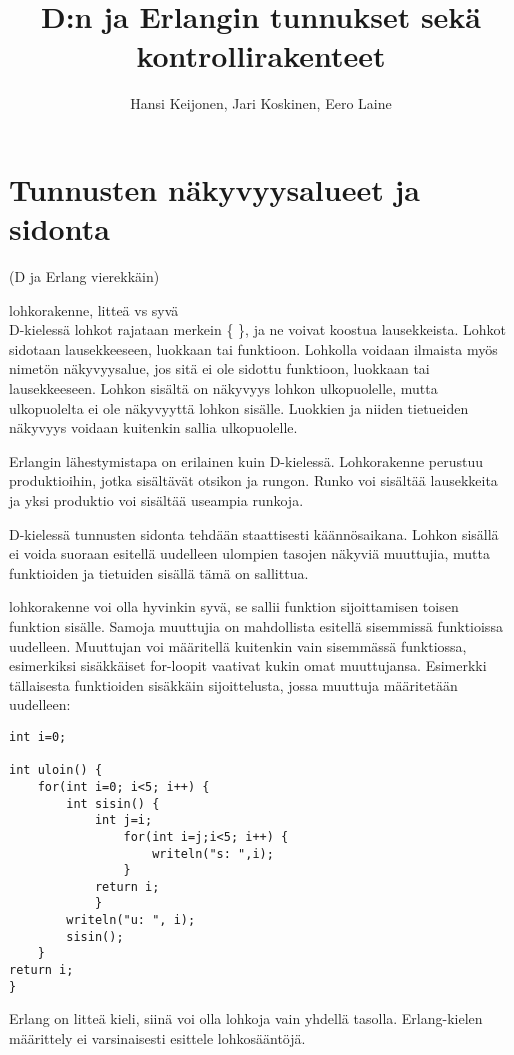 \documentclass[11pt,oneside,a4paper]{article}
\title{D:n ja Erlangin tunnukset sekä kontrollirakenteet}
\author{Hansi Keijonen, Jari Koskinen, Eero Laine}
\begin{document}
\maketitle



\section{Tunnusten näkyvyysalueet ja sidonta}
(D ja Erlang vierekkäin)

lohkorakenne, litteä vs syvä \\
D-kielessä lohkot rajataan merkein \{ \}, ja ne voivat koostua lausekkeista. Lohkot sidotaan lausekkeeseen, luokkaan tai funktioon. Lohkolla voidaan ilmaista myös nimetön näkyvyysalue, jos sitä ei ole sidottu funktioon, luokkaan tai lausekkeeseen. Lohkon sisältä on näkyvyys lohkon ulkopuolelle, mutta ulkopuolelta ei ole näkyvyyttä lohkon sisälle. Luokkien ja niiden tietueiden näkyvyys voidaan kuitenkin sallia ulkopuolelle.

Erlangin lähestymistapa on erilainen kuin D-kielessä. Lohkorakenne perustuu produktioihin, jotka sisältävät otsikon ja rungon. Runko voi sisältää lausekkeita ja yksi produktio voi sisältää useampia runkoja.

D-kielessä tunnusten sidonta tehdään staattisesti käännösaikana. Lohkon sisällä ei voida suoraan esitellä uudelleen ulompien tasojen näkyviä muuttujia, mutta funktioiden ja tietuiden sisällä tämä on sallittua.

 lohkorakenne voi olla hyvinkin syvä, se sallii funktion sijoittamisen toisen funktion sisälle. Samoja muuttujia on mahdollista esitellä sisemmissä funktioissa uudelleen. Muuttujan voi määritellä kuitenkin vain sisemmässä funktiossa, esimerkiksi sisäkkäiset for-loopit vaativat kukin omat muuttujansa. Esimerkki tällaisesta funktioiden sisäkkäin sijoittelusta, jossa muuttuja määritetään uudelleen:

\begin{verbatim}
int i=0;

int uloin() {
    for(int i=0; i<5; i++) {
        int sisin() {
            int j=i;
                for(int i=j;i<5; i++) {
                    writeln("s: ",i);
                }
            return i;
            }
        writeln("u: ", i);
        sisin();
    }
return i;
}
\end{verbatim}

Erlang on litteä kieli, siinä voi olla lohkoja vain yhdellä tasolla. Erlang-kielen määrittely ei varsinaisesti esittele lohkosääntöjä. \\
\end{document}
